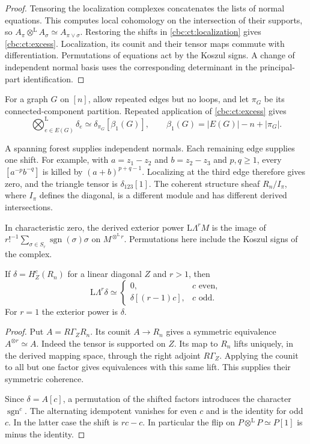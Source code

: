 \begin{proof}
Tensoring the localization complexes concatenates the lists of
normal equations. This computes local cohomology on the
intersection of their supports, so
$A_\pi\otimes^{\mathrm L}A_\sigma\simeq A_{\pi\vee\sigma}$.
Restoring the shifts in \eqref{cbc:ct:localization} gives
\eqref{cbc:ct:excess}. Localization, its counit and their tensor
maps commute with differentiation. Permutations of equations
act by the Koszul signs. A change of independent normal basis
uses the corresponding determinant in the principal-part
identification.
\end{proof}

For a graph $G$ on $[n]$, allow repeated edges but no loops,
and let $\pi_G$ be its connected-component partition. Repeated
application of \eqref{cbc:ct:excess} gives
\begin{equation}\label{cbc:ct:graph}
 \bigotimes_{e\in E(G)}^{\mathrm L}\delta_e
  \simeq\delta_{\pi_G}[\beta_1(G)],\qquad
 \beta_1(G)=|E(G)|-n+|\pi_G|.
\end{equation}

A spanning forest supplies independent normals. Each remaining
edge supplies one shift. For example, with $a=z_1-z_2$ and
$b=z_2-z_3$ and $p,q\geq1$, every $[a^{-p}b^{-q}]$ is killed by
$(a+b)^{p+q-1}$. Localizing at the third edge therefore gives
zero, and the triangle tensor is $\delta_{123}[1]$.
The coherent structure sheaf $R_n/I_\pi$, where $I_\pi$
defines the diagonal, is a different module
and has different derived intersections.

In characteristic zero, the derived exterior power
$\mathrm L\Lambda^rM$ is the image of
$r!^{-1}\sum_{\sigma\in S_r}\operatorname{sgn}(\sigma)\sigma$
on $M^{\otimes^{\mathrm L}r}$. Permutations here include
the Koszul signs of the complex.

\begin{lemma}\label{cbc:ct:normal-exterior}
If $\delta=H^c_Z(R_n)$ for a linear diagonal $Z$ and $r>1$,
then
\[
 \mathrm L\Lambda^r\delta\simeq
 \begin{cases}
  0,&c\text{ even},\\
  \delta[(r-1)c],&c\text{ odd}.
 \end{cases}
\]
For $r=1$ the exterior power is $\delta$.
\end{lemma}

\begin{proof}
Put $A=R\Gamma_ZR_n$. Its counit $A\to R_n$ gives a
symmetric equivalence $A^{\otimes r}\simeq A$. Indeed the
tensor is supported on $Z$. Its map to $R_n$ lifts uniquely,
in the derived mapping space, through the right adjoint
$R\Gamma_Z$. Applying the counit to all but one factor gives
equivalences with this same lift. This supplies their symmetric
coherence.

Since $\delta=A[c]$, a permutation of the shifted factors
introduces the character $\operatorname{sgn}^c$. The alternating
idempotent vanishes for even $c$ and is the identity for odd
$c$. In the latter case the shift is $rc-c$. In particular
the flip on $P\otimes^{\mathrm L}P\simeq P[1]$ is minus
the identity.
\end{proof}

